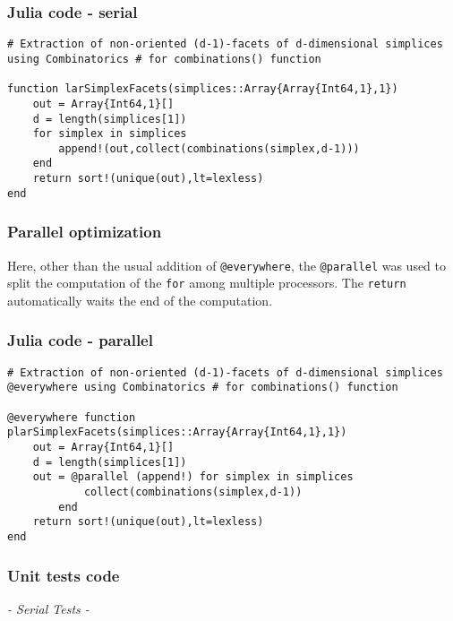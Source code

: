 \documentclass[a4paper,12pt,titlepage]{article}					%
\begin{document}
\subsubsection{Julia code - serial}
\begin{Verbatim}
# Extraction of non-oriented (d-1)-facets of d-dimensional simplices
using Combinatorics # for combinations() function

function larSimplexFacets(simplices::Array{Array{Int64,1},1})
	out = Array{Int64,1}[]
	d = length(simplices[1])
	for simplex in simplices
		append!(out,collect(combinations(simplex,d-1)))
	end
	return sort!(unique(out),lt=lexless)
end
\end{Verbatim}

\subsubsection{Parallel optimization}
Here, other than the usual addition of \texttt{@everywhere}, the \texttt{@parallel} was used to split the computation of the \texttt{for} among multiple processors.
The \texttt{return} automatically waits the end of the computation.

\subsubsection{Julia code - parallel}
\begin{Verbatim}
# Extraction of non-oriented (d-1)-facets of d-dimensional simplices
@everywhere using Combinatorics # for combinations() function

@everywhere function plarSimplexFacets(simplices::Array{Array{Int64,1},1})
	out = Array{Int64,1}[]
	d = length(simplices[1])
	out = @parallel (append!) for simplex in simplices
			collect(combinations(simplex,d-1))
		end
	return sort!(unique(out),lt=lexless)
end
\end{Verbatim}

\subsubsection{Unit tests code}
\emph{- Serial Tests -}
\end{document}
